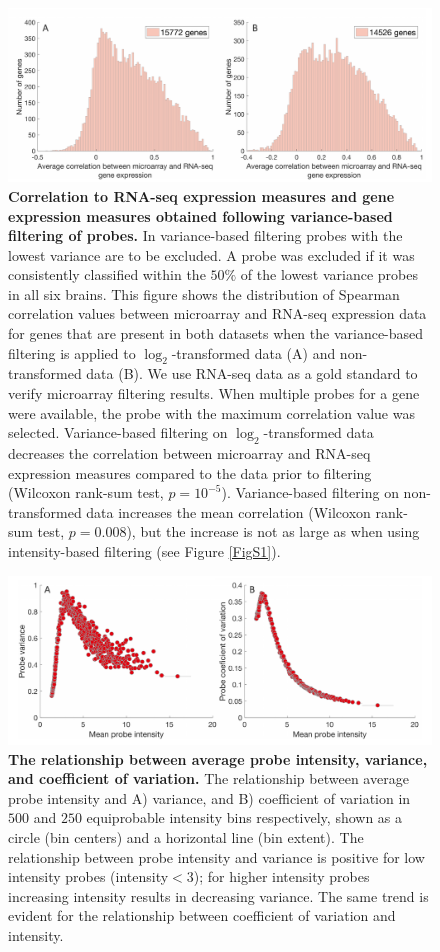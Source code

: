 \documentclass[10pt,A4]{article}
\begin{document}
\begin{figure}[h!]
  \centering
    \includegraphics[width=1\textwidth]{FigureS3.pdf}
\caption{\textbf{Correlation to RNA-seq expression measures and gene expression measures obtained following variance-based filtering of probes.}
In variance-based filtering probes with the lowest variance are to be excluded. A probe was excluded if it was consistently classified within the $50\%$ of the  lowest variance probes in all six brains. This figure shows the distribution of Spearman correlation values between microarray and RNA-seq expression data for genes that are present in both datasets when the variance-based filtering is applied to $\log_2$-transformed data (A) and non-transformed data (B). We use RNA-seq data as a gold standard to verify microarray filtering results. When multiple probes for a gene were available, the probe with the maximum correlation value was selected. Variance-based filtering on $\log_2$-transformed data decreases the correlation between microarray and RNA-seq expression measures compared to the data prior to filtering (Wilcoxon rank-sum test, $p = 10^{-5}$). Variance-based filtering on non-transformed data increases the mean correlation (Wilcoxon rank-sum test, $p = 0.008$), but the increase is not as large as when using intensity-based filtering (see Figure \ref{FigS1}).}
\label{FigS3}
\end{figure}

\begin{figure}[h!]
  \centering
    \includegraphics[width=1\textwidth]{FigureS4.pdf}
\caption{\textbf{The relationship between average probe intensity, variance, and coefficient of variation.}
The relationship between average probe intensity and A) variance, and B) coefficient of variation in $500$ and $250$ equiprobable intensity bins respectively, shown as a circle (bin centers) and a horizontal line (bin extent). The relationship between probe intensity and variance is positive for low intensity probes (intensity$<3$); for higher intensity probes increasing intensity results in decreasing variance. The same trend is evident for the relationship between coefficient of variation and intensity.}
\label{FigS4}
\end{figure}
\end{document}
